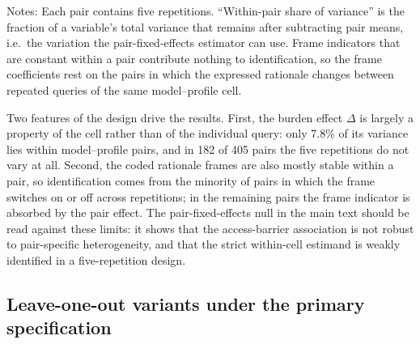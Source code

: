 \documentclass[11pt]{article}
\begin{document}
\begin{table}[htbp]
\centering
\caption{Within-pair variation available to the pair-fixed-effects specification}
\label{tab:h2_within_pair}
\begin{flushleft}
\footnotesize Notes: Each pair contains five repetitions. ``Within-pair share of variance'' is the fraction of a variable's total variance that remains after subtracting pair means, i.e.\ the variation the pair-fixed-effects estimator can use. Frame indicators that are constant within a pair contribute nothing to identification, so the frame coefficients rest on the pairs in which the expressed rationale changes between repeated queries of the same model--profile cell.
\end{flushleft}
\end{table}

Two features of the design drive the results. First, the burden effect \(\Delta\) is largely a property of the cell rather than of the individual query: only 7.8\% of its variance lies within model--profile pairs, and in 182 of 405 pairs the five repetitions do not vary at all. Second, the coded rationale frames are also mostly stable within a pair, so identification comes from the minority of pairs in which the frame switches on or off across repetitions; in the remaining pairs the frame indicator is absorbed by the pair effect. The pair-fixed-effects null in the main text should be read against these limits: it shows that the access-barrier association is not robust to pair-specific heterogeneity, and that the strict within-cell estimand is weakly identified in a five-repetition design.

\subsection*{Leave-one-out variants under the primary specification}
\end{document}
